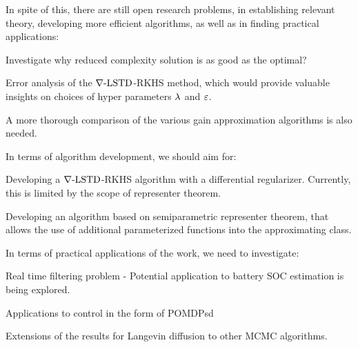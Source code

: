 In spite of this, there are still open research problems, in establishing relevant theory, developing more efficient algorithms, as well as in finding practical applications: 
\begin{romannum}
\item Investigate why reduced complexity solution is as good as the optimal?
\item Error analysis of the $\nabla\text{-LSTD}$-RKHS method, which would provide valuable insights on choices of hyper parameters $\lambda$ and $\varepsilon$.
\item A more thorough comparison of the various gain approximation algorithms is also needed.
\end{romannum}

In terms of algorithm development, we should aim for:
\begin{romannum}
\item Developing a $\nabla\text{-LSTD}$-RKHS algorithm with a differential regularizer. Currently, this is limited by the scope of representer theorem. 
\item Developing an algorithm based on semiparametric representer theorem, that allows the use of additional parameterized functions into the approximating class.
\end{romannum}
In terms of practical applications of the work, we need to investigate:
\begin{romannum}
\item  Real time filtering problem - Potential application to battery SOC estimation is being explored. 
\item Applications to control in the form of POMDPsd
\item Extensions of the results for Langevin diffusion to other MCMC algorithms.
\end{romannum}

